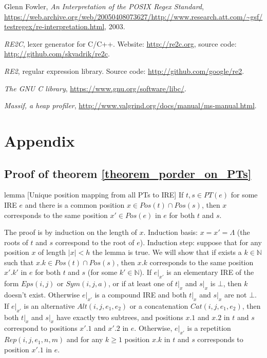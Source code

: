 \documentclass[AMA,STIX1COL]{WileyNJD-v2}
\newcommand{\YN}{\mathbb{N}}
\newcommand{\Eps}{E\!ps}
\newcommand{\Sym}{S\!ym}
\newcommand{\Alt}{Alt}
\newcommand{\Cat}{C\!at}
\newcommand{\Rep}{Rep}
\begin{document}
\begin{thebibliography}{99}
    Glenn Fowler,
    \textit{An Interpretation of the POSIX Regex Standard},
    \url{https://web.archive.org/web/20050408073627/http://www.research.att.com/~gsf/testregex/re-interpretation.html},
    2003.

    \textit{RE2C}, lexer generator for C/C++.
    Website: \url{http://re2c.org},
    source code: \url{http://github.com/skvadrik/re2c}.

    \textit{RE2}, regular expression library.
    Source code: \url{http://github.com/google/re2}.

    \textit{The GNU C library},
    \url{https://www.gnu.org/software/libc/}.

    \textit{Massif, a heap profiler},
    \url{http://www.valgrind.org/docs/manual/ms-manual.html}.

\end{thebibliography}


\vfill\null
\clearpage


\section*{Appendix}

\subsection*{Proof of theorem \ref{theorem_porder_on_PTs}}

\begin{theoremEnd}{lemma}
[Unique position mapping from all PTs to IRE]
    \label{lemma_positions}
    If $t, s \in PT(e)$ for some IRE $e$
    and there is a common position $x \in Pos(t) \cap Pos(s)$,
    then $x$ corresponds to the same position $x' \in Pos(e)$ in $e$ for both $t$ and $s$.
\end{theoremEnd}
\begin{proofEnd}
    The proof is by induction on the length of $x$.
    Induction basis: $x = x' = \Lambda$ (the roots of $t$ and $s$ correspond to the root of $e$).
    Induction step: suppose that for any position $x$ of length $|x| < h$ the lemma is true.
    We will show that if exists a $k \in \YN$ such that $x.k \in Pos(t) \cap Pos(s)$,
    then $x.k$ corresponds to the same position $x'.k'$ in $e$ for both $t$ and $s$ (for some $k' \in \YN$).
    If $e|_{x'}$ is an elementary IRE of the form $\Eps(i, j)$ or $\Sym(i, j, a)$,
    or if at least one of $t|_x$ and $s|_x$ is $\bot$,
    then $k$ doesn't exist.
    Otherwise $e|_{x'}$ is a compound IRE and both $t|_x$ and $s|_x$ are not $\bot$.
    If $e|_{x'}$ is an alternative $\Alt(i, j, e_1, e_2)$
    or a concatenation $\Cat(i, j, e_1, e_2)$,
    then both $t|_x$ and $s|_x$ have exactly two subtrees,
    and positions $x.1$ and $x.2$ in $t$ and $s$ correspond to positions $x'.1$ and $x'.2$ in $e$.
    Otherwise, $e|_{x'}$ is a repetition $\Rep(i, j, e_1, n, m)$
    and for any $k \geq 1$ position $x.k$ in $t$ and $s$ corresponds to position $x'.1$ in $e$.
\end{proofEnd}
\end{document}
